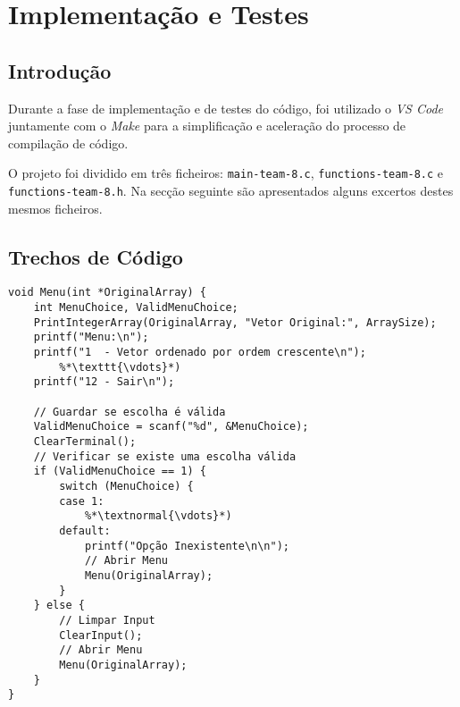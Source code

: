 \chapter{Implementação e Testes}
\label{chap:imp-test}

\section{Introdução}
\label{chap4:sec:intro}

\par Durante a fase de implementação e de testes do código, foi utilizado o \textit{\ac{VS Code}} juntamente com o \textit{Make} para a simplificação e aceleração do processo de compilação de código.
\par
O projeto foi dividido em três ficheiros: \texttt{main-team-8.c}, \texttt{functions-team-8.c} e \texttt{functions-team-8.h}. Na secção seguinte são apresentados alguns excertos destes mesmos ficheiros.

\newpage

\section{Trechos de Código}
\label{chap4:sec:code}

\begin{lstlisting}[caption=Mostrar Menu e Verificar Opção escolhida., label=chap4:code:1]
void Menu(int *OriginalArray) {
    int MenuChoice, ValidMenuChoice;
    PrintIntegerArray(OriginalArray, "Vetor Original:", ArraySize);
    printf("Menu:\n");
    printf("1  - Vetor ordenado por ordem crescente\n");
        %*\texttt{\vdots}*)
    printf("12 - Sair\n");

    // Guardar se escolha é válida
    ValidMenuChoice = scanf("%d", &MenuChoice); 
    ClearTerminal();
    // Verificar se existe uma escolha válida
    if (ValidMenuChoice == 1) {
        switch (MenuChoice) {
        case 1:
            %*\textnormal{\vdots}*)
        default:
            printf("Opção Inexistente\n\n");
            // Abrir Menu
            Menu(OriginalArray);
        }
    } else {
        // Limpar Input
        ClearInput();
        // Abrir Menu
        Menu(OriginalArray);
    }
}
\end{lstlisting}

\newpage

